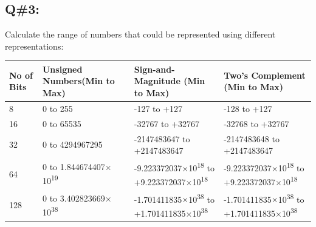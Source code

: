 \subsection*{Q\#3:}
Calculate the range of numbers that could be represented using different representations:

\begin{table}[htbp]
\begin{tabularx}{\textwidth}{| X | X | X | X |}
\hline
\textbf{No of Bits} & \textbf{Unsigned Numbers(Min to Max)} & \textbf{Sign-and-Magnitude (Min to Max)} & \textbf{Two’s Complement (Min to Max)} \\

\hline
8 & 0 to 255 & -127 to +127 & -128 to +127 \\
\hline
16 & 0 to 65535 & -32767 to +32767 & -32768 to +32767 \\
\hline
32 & 0 to 4294967295 & -2147483647 to +2147483647 & -2147483648 to +2147483647 \\
\hline
64 & 0 to 1.844674407$\times$10\textsuperscript{19} & 
-9.223372037$\times$10\textsuperscript{18} to +9.223372037$\times$10\textsuperscript{18} & 
-9.223372037$\times$10\textsuperscript{18} to +9.223372037$\times$10\textsuperscript{18} \\
\hline
128 & 0 to 3.402823669$\times$10\textsuperscript{38} & 
-1.701411835$\times$10\textsuperscript{38} to +1.701411835$\times$10\textsuperscript{38} & 
-1.701411835$\times$10\textsuperscript{38} to +1.701411835$\times$10\textsuperscript{38} \\
\hline
\end{tabularx}
\end{table}
